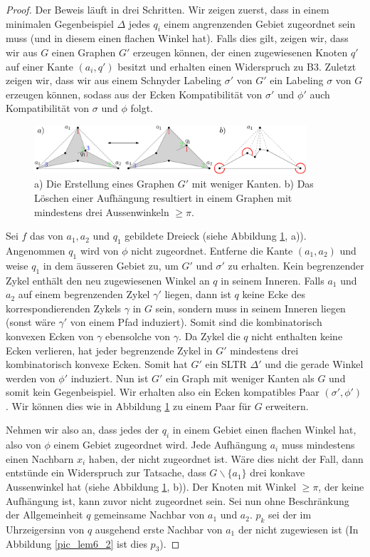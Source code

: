 \begin{proof}
Der Beweis läuft in drei Schritten. Wir zeigen zuerst, dass in einem minimalen Gegenbeispiel $\Delta$ jedes $q_i$ einem angrenzenden Gebiet zugeordnet sein muss (und in diesem einen flachen Winkel hat). Falls dies gilt, zeigen wir, dass wir aus $G$ einen Graphen $G'$ erzeugen können, der einen zugewiesenen Knoten $q'$ auf einer Kante $(a_i,q')$ besitzt und erhalten einen Widerspruch zu B3. Zuletzt zeigen wir, dass wir aus einem Schnyder Labeling $\sigma'$ von $G'$ ein Labeling $\sigma$ von $G$ erzeugen können, sodass aus der Ecken Kompatibilität von $\sigma'$ und $\phi'$ auch Kompatibilität von $\sigma$ und $\phi$ folgt.

\begin{figure}
	\centering
	  \includegraphics[width=0.9\textwidth]{lem6_1.png}
    	\caption{a) Die Erstellung eines Graphen $G'$ mit weniger Kanten. b) Das Löschen einer Aufhängung resultiert in einem Graphen mit mindestens drei Aussenwinkeln $\geq \pi$.}
    	\label{pic_lem6_1}
\end{figure}

Sei $f$ das von $a_1,a_2$ und $q_1$ gebildete Dreieck (siehe Abbildung \ref{pic_lem6_1}, a)). Angenommen $q_1$ wird von $\phi$ nicht zugeordnet. Entferne die Kante $(a_1,a_2)$ und weise $q_1$ in dem äusseren Gebiet zu, um $G'$ und $\sigma'$ zu erhalten. Kein begrenzender Zykel enthält den neu zugewiesenen Winkel an $q$ in seinem Inneren. Falls $a_1$ und $a_2$ auf einem begrenzenden Zykel $\gamma'$ liegen, dann ist $q$ keine Ecke des korrespondierenden Zykels $\gamma$ in $G$ sein, sondern muss in seinem Inneren liegen (sonst wäre $\gamma'$ von einem Pfad induziert). Somit sind die kombinatorisch konvexen Ecken von $\gamma$ ebensolche von $\gamma$. Da Zykel die $q$ nicht enthalten keine Ecken verlieren, hat jeder begrenzende Zykel in $G'$ mindestens drei kombinatorisch konvexe Ecken. Somit hat $G'$ ein SLTR $\Delta'$ und die gerade Winkel werden von $\phi'$ induziert. Nun ist $G'$ ein Graph mit weniger Kanten als $G$ und somit kein Gegenbeispiel. Wir erhalten also ein Ecken kompatibles Paar $(\sigma',\phi')$. Wir können dies wie in Abbildung \ref{pic_lem6_1} zu einem Paar für $G$ erweitern.

Nehmen wir also an, dass jedes der $q_i$ in einem Gebiet einen flachen Winkel hat, also von $\phi$ einem Gebiet zugeordnet wird. Jede Aufhängung $a_i$ muss mindestens einen Nachbarn $x_i$ haben, der nicht zugeordnet ist. Wäre dies nicht der Fall, dann entstünde ein Widerspruch zur Tatsache, dass $G\backslash \{a_1\}$ drei konkave Aussenwinkel hat (siehe Abbildung \ref{pic_lem6_1}, b)). Der Knoten mit Winkel $\geq \pi$, der keine Aufhängung ist, kann zuvor nicht zugeordnet sein. Sei nun ohne Beschränkung der Allgemeinheit $q$ gemeinsame Nachbar von $a_1$ und $a_2$. $p_k$ sei der im Uhrzeigersinn von $q$ ausgehend erste Nachbar von $a_1$ der nicht zugewiesen ist (In Abbildung \ref{pic_lem6_2} ist dies $p_3$).


\end{proof}
